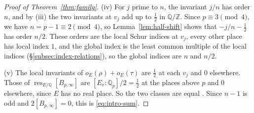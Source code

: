\documentclass[a4paper,11pt]{amsart}
\theoremstyle{definition}
\theoremstyle{remark}
\numberwithin{equation}{section}
\newcommand{\Q}{\mathbb{Q}}
\newcommand{\Z}{\mathbb{Z}}
\DeclareMathOperator{\res}{res}
\newcommand{\Bpinf}{B_{p,\infty}}
\begin{document}
\begin{proof}[Proof of Theorem~\ref{thm:family}]
(iv) For $j$ prime to $n$, the invariant $j/n$ has order $n$, and by (iii) the two invariants at $v_j$ add up to $\frac12$ in $\Q/\Z$. Since $p\equiv3\pmod4$, we have $n=p-1\equiv2\pmod4$, so Lemma~\ref{lem:half-shift} shows that $-j/n-\frac12$ has order $n/2$. These orders are the local Schur indices at $v_j$, every other place has local index $1$, and the global index is the least common multiple of the local indices (\S\ref{subsec:index-relations}), so the global indices are $n$ and $n/2$.

(v) The local invariants of $o_E(\rho)+o_E(\tau)$ are $\frac12$ at each $v_j$ and $0$ elsewhere. Those of $\res_{E/\Q}[\Bpinf]$ are $[E_v:\Q_p]/2=\frac12$ at the places above $p$ \cite[III, \S2, (29)]{Mil20} and $0$ elsewhere, since $E$ has no real place. So the two classes are equal \cite[VII, Theorem~7.1]{Mil20}. Since $n-1$ is odd and $2[\Bpinf]=0$, this is \eqref{eq:intro-sum}.
\end{proof}
\end{document}
